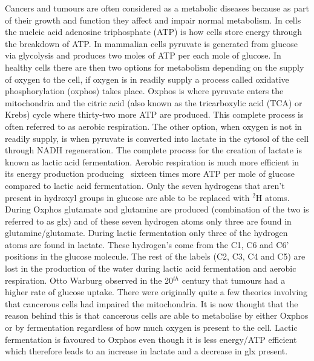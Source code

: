 \documentclass[class=article, crop=false]{standalone}
\begin{document}
Cancers and tumours are often considered as a metabolic diseases because as part of their growth and function they affect and impair normal metabolism. In cells the nucleic acid adenosine triphosphate (ATP) is how cells store energy through the breakdown of ATP. In mammalian cells pyruvate is generated from glucose via glycolysis and produces two moles of ATP per each mole of glucose. In healthy cells there are then two options for metabolism depending on the supply of oxygen to the cell, if oxygen is in readily supply a process called oxidative phosphorylation (oxphos) takes place. Oxphos is where pyruvate enters the mitochondria and the citric acid (also known as the tricarboxylic acid (TCA) or Krebs) cycle where thirty-two more ATP are produced. This complete process is often referred to as aerobic respiration. The other option, when oxygen is not in readily supply, is when pyruvate is converted into lactate in the cytosol of the cell through NADH regeneration. The complete process for the creation of lactate is known as lactic acid fermentation. Aerobic respiration is much more efficient in its energy production producing ~sixteen times more ATP per mole of glucose compared to lactic acid fermentation\cite{Romero-Garcia2011TumorView}. Only the seven hydrogens that aren't present in hydroxyl groups in glucose are able to be replaced with $^2$H atoms. During Oxphos glutamate and glutamine are produced (combination of the two is referred to as glx) and of these seven hydrogen atoms only three are found in glutamine/glutamate. During lactic fermentation only three of the hydrogen atoms are found in lactate. These hydrogen's come from the C1, C6 and C6' positions in the glucose molecule. The rest of the labels (C2, C3, C4 and C5) are lost in the production of the water during lactic acid fermentation and aerobic respiration. Otto Warburg observed in the 20$^{th}$ century that tumours had a higher rate of glucose uptake\cite{WarburgBerlin-Dahlem1925TheCells,Warburg1956OnCells}. There were originally quite a few theories involving that cancerous cells had impaired the mitochondria. It is now thought that the reason behind this is that cancerous cells are able to metabolise by either Oxphos or by fermentation regardless of how much oxygen is present to the cell. Lactic fermentation is favoured to Oxphos even though it is less energy/ATP efficient which therefore leads to an increase in lactate and a decrease in glx present\cite{Romero-Garcia2011TumorView}.
\end{document}
